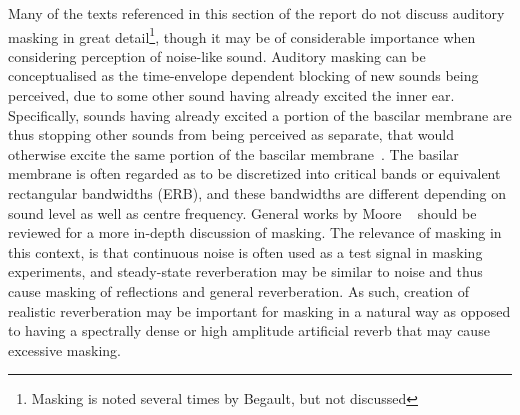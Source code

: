 \documentclass[paper=a4, fontsize=10pt, font=arial]{scrartcl} %
\numberwithin{equation}{section} %
\numberwithin{figure}{section} %
\numberwithin{table}{section} %
\begin{document}
Many of the texts referenced in this section of the report do not discuss auditory masking in great detail\footnote{Masking is noted several times by Begault, but not discussed}, though it may be of considerable importance when considering perception of noise-like sound.
Auditory masking can be conceptualised as the time-envelope dependent blocking of new sounds being perceived, due to some other sound having already excited the inner ear. 
Specifically, sounds having already excited a portion of the bascilar membrane are thus stopping other sounds from being perceived as separate, that would otherwise excite the same portion of the bascilar membrane~\cite{Everest2009}. 
The basilar membrane is often regarded as to be discretized into critical bands or equivalent rectangular bandwidths (ERB), and these bandwidths are different depending on sound level as well as centre frequency. 
General works by Moore ~\cite{Moore1996} should be reviewed for a more in-depth discussion of masking. The relevance of masking in this context, is that continuous noise is often used as a test signal in masking experiments, and steady-state reverberation may be similar to noise and thus cause masking of reflections and general reverberation. As such, creation of realistic reverberation may be important for masking in a natural way as opposed to having a spectrally dense or high amplitude artificial reverb that may cause excessive masking.
\end{document}
